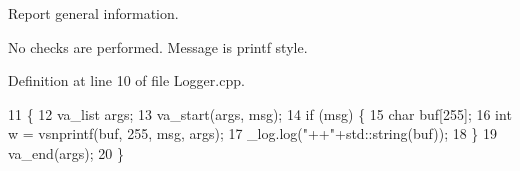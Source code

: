 Report general information. 

No checks are performed. Message is printf style. 

Definition at line 10 of file Logger.\+cpp.


\begin{DoxyCode}
11 \{
12     va\_list args;
13     va\_start(args, msg);
14     \textcolor{keywordflow}{if} (msg) \{
15         \textcolor{keywordtype}{char} buf[255];
16         \textcolor{keywordtype}{int} w = vsnprintf(buf, 255, msg, args);
17         \_log.log(\textcolor{stringliteral}{"++"}+std::string(buf));
18     \}
19     va\_end(args);
20 \}
\end{DoxyCode}
